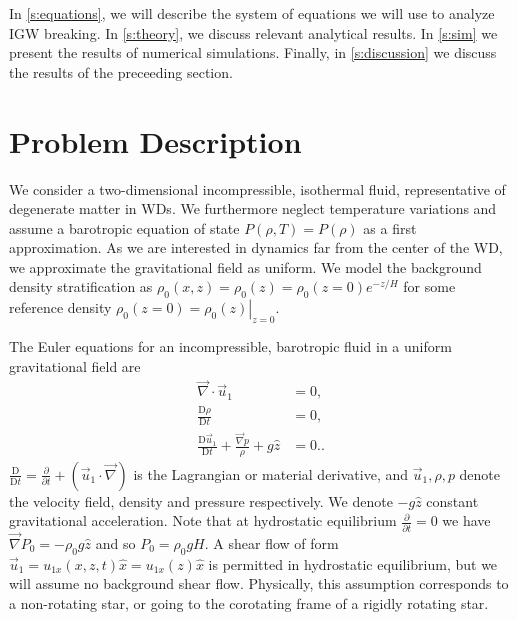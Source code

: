 \documentclass[
        fleqn,
        usenatbib,
    ]{mnras}
\newcommand*{\pd}[2]{\frac{\partial#1}{\partial#2}}
\newcommand*{\md}[2]{\frac{\mathrm{D}#1}{\mathrm{D}#2}}
\newcommand*{\at}[1]{\left.#1\right|}
\newcommand*{\p}[1]{\left(#1\right)}
\begin{document}

In \autoref{s:equations}, we will describe the system of equations we will
use to analyze IGW breaking. In \autoref{s:theory}, we discuss relevant
analytical results. In \autoref{s:sim} we present the results of numerical
simulations. Finally, in \autoref{s:discussion} we discuss the results of the
preceeding section.

\section{Problem Description}\label{s:equations}

We consider a two-dimensional incompressible, isothermal fluid, representative
of degenerate matter in WDs. We furthermore neglect temperature variations and
assume a barotropic equation of state $P(\rho, T) = P(\rho)$ as a first
approximation. As we are interested in dynamics far from the center of the WD,
we approximate the gravitational field as uniform. We model the background
density stratification as $\rho_0(x, z) = \rho_0(z) = \rho_0(z=0) e^{-z/H}$ for
some reference density $\rho_0(z=0) = \at{\rho_0(z)}_{z = 0}$.

The Euler equations for an incompressible, barotropic fluid in a uniform
gravitational field are
\begin{subequations}\label{se:nl_orig}
    \begin{align}
        \vec{\nabla} \cdot \vec{u}_1 &= 0,\label{eq:nl_incomp}\\
        \md{\rho}{t} &= 0 ,\label{eq:nl_density}\\
        \md{\vec{u}_1}{t} + \frac{\vec{\nabla}p}{\rho} + g\hat{z} &=
            0.\label{eq:nl_mom}.
    \end{align}
\end{subequations}
$\md{}{t} = \pd{}{t} + \p{\vec{u}_1 \cdot \vec{\nabla}}$ is the Lagrangian or
material derivative, and $\vec{u}_1, \rho, p$ denote the velocity field, density
and pressure respectively. We denote $-g\hat{z}$ constant gravitational
acceleration. Note that at hydrostatic equilibrium $\pd{}{t} = 0$ we have
$\vec{\nabla}P_0 = -\rho_0 g\hat{z}$ and so $P_0 = \rho_0 gH$. A shear flow of
form $\vec{u}_1 = u_{1x}(x, z, t)\hat{x} = u_{1x}(z)\hat{x}$ is permitted in hydrostatic
equilibrium, but we will assume no background shear flow. Physically, this
assumption corresponds to a non-rotating star, or going to the corotating frame
of a rigidly rotating star.
\end{document}

